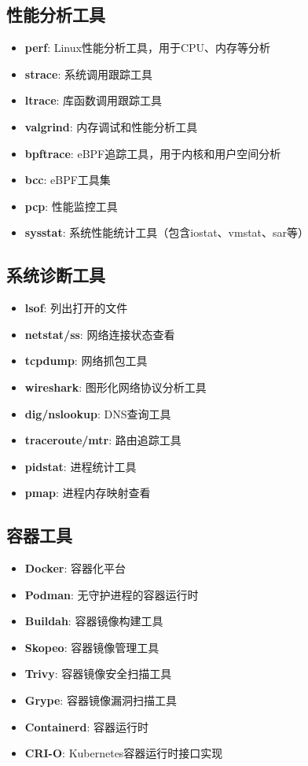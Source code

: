 \documentclass[12pt,UTF8]{ctexbook}
\begin{document}
\subsection*{性能分析工具}

\begin{itemize}
    \item \textbf{perf}: Linux性能分析工具，用于CPU、内存等分析
    \item \textbf{strace}: 系统调用跟踪工具
    \item \textbf{ltrace}: 库函数调用跟踪工具
    \item \textbf{valgrind}: 内存调试和性能分析工具
    \item \textbf{bpftrace}: eBPF追踪工具，用于内核和用户空间分析
    \item \textbf{bcc}: eBPF工具集
    \item \textbf{pcp}: 性能监控工具
    \item \textbf{sysstat}: 系统性能统计工具（包含iostat、vmstat、sar等）
\end{itemize}

\subsection*{系统诊断工具}

\begin{itemize}
    \item \textbf{lsof}: 列出打开的文件
    \item \textbf{netstat/ss}: 网络连接状态查看
    \item \textbf{tcpdump}: 网络抓包工具
    \item \textbf{wireshark}: 图形化网络协议分析工具
    \item \textbf{dig/nslookup}: DNS查询工具
    \item \textbf{traceroute/mtr}: 路由追踪工具
    \item \textbf{pidstat}: 进程统计工具
    \item \textbf{pmap}: 进程内存映射查看
\end{itemize}

\subsection*{容器工具}

\begin{itemize}
    \item \textbf{Docker}: 容器化平台
    \item \textbf{Podman}: 无守护进程的容器运行时
    \item \textbf{Buildah}: 容器镜像构建工具
    \item \textbf{Skopeo}: 容器镜像管理工具
    \item \textbf{Trivy}: 容器镜像安全扫描工具
    \item \textbf{Grype}: 容器镜像漏洞扫描工具
    \item \textbf{Containerd}: 容器运行时
    \item \textbf{CRI-O}: Kubernetes容器运行时接口实现
\end{itemize}
\end{document}
